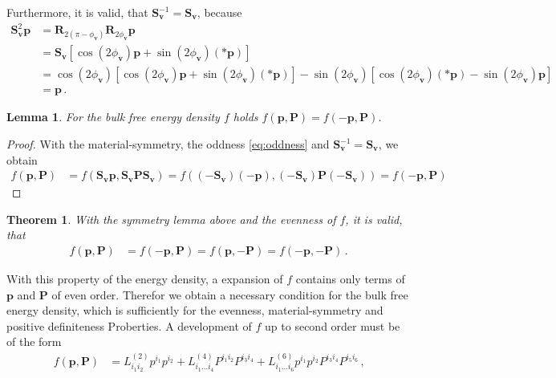 \documentclass{scrartcl}
\newcommand{\formComma}{\,\text{,}}
\newcommand{\formPeriod}{\,\text{.}}
\newcommand{\pb}{\mathbf{p}}%
\newcommand{\vb}{\mathbf{v}}%
\newcommand{\Pb}{\mathbf{P}}%
\newcommand{\Rb}{\mathbf{R}}
\newcommand{\Sb}{\mathbf{S}}
\newtheorem{theorem}{Theorem}
\newtheorem{lemma}{Lemma}
\begin{document}
      Furthermore, it is valid, that \( \Sb_{\vb}^{-1} = \Sb_{\vb} \), because
      \begin{align}
        \Sb_{\vb}^{2}\pb &=   \Rb_{2(\pi-\phi_{\vb})} \Rb_{2\phi_{\vb}} \pb\\
                  &= \Sb_{\vb}\left[ \cos(2\phi_{\vb})\pb + \sin(2\phi_{\vb})(*\pb) \right] \\
                  &= \cos(2\phi_{\vb})\left[ \cos(2\phi_{\vb})\pb + \sin(2\phi_{\vb})(*\pb) \right]
                    -\sin(2\phi_{\vb})\left[ \cos(2\phi_{\vb})(*\pb) - \sin(2\phi_{\vb})\pb \right]\\
                  &= \pb \formPeriod
      \end{align}
      \begin{lemma}
        For the bulk free energy density \( f \) holds \( f(\pb,\Pb) = f(-\pb,\Pb) \).
      \end{lemma}
      \begin{proof}
        With the material-symmetry, the oddness \eqref{eq:oddness} and \( \Sb_{\vb}^{-1} = \Sb_{\vb} \), we
        obtain
        \begin{align}
          f(\pb,\Pb) &= f( \Sb_{\vb}\pb, \Sb_{\vb}\Pb \Sb_{\vb})
                      = f( (-\Sb_{\vb})(-\pb), (-\Sb_{\vb})\Pb (-\Sb_{\vb}))
                      = f(-\pb,\Pb)
        \end{align}
      \end{proof}
      \begin{theorem}
        With the symmetry lemma above and the evenness of \( f \), it is valid, that
        \begin{align}
          f(\pb,\Pb) &= f(-\pb,\Pb) = f(\pb,-\Pb) = f(-\pb,-\Pb) \formPeriod
        \end{align}
      \end{theorem}
      With this property of the energy density, a expansion of \( f \) contains only terms of \( \pb \)
      and \( \Pb \) of even order.
      Therefor we obtain a necessary condition for the bulk free energy density,
      which is sufficiently for the evenness, material-symmetry and positive definiteness Proberties. 
      A development of \( f \) up to second order must be of the form
      \begin{align}\label{eq:prototype}
        f(\pb,\Pb) &= L^{(2)}_{i_{1}i_{2}}p^{i_{1}}p^{i_{2}}
                        + L^{(4)}_{i_{1}\ldots i_{4}}P^{i_{1}i_{2}}P^{i_{3}i_{4}}
                        + L^{(6)}_{i_{1}\ldots i_{6}} p^{i_{1}}p^{i_{2}}P^{i_{3}i_{4}}P^{i_{5}i_{6}} \formComma
      \end{align}
\end{document}
